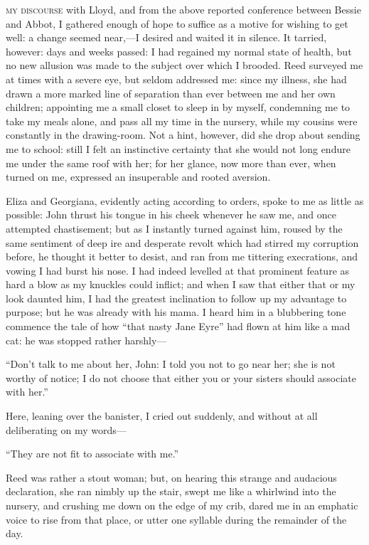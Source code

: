 
 \textsc{my discourse} with \Mr{} Lloyd, and from the above reported conference
between Bessie and Abbot, I gathered enough of hope to suffice as a
motive for wishing to get well: a change seemed near,---I desired and
waited it in silence. It tarried, however: days and weeks passed: I had
regained my normal state of health, but no new allusion was made to the
subject over which I brooded. \Mrs{} Reed surveyed me at times with a
severe eye, but seldom addressed me: since my illness, she had drawn a
more marked line of separation than ever between me and her own
children; appointing me a small closet to sleep in by myself, condemning
me to take my meals alone, and pass all my time in the nursery, while my
cousins were constantly in the drawing-room. Not a hint, however, did
she drop about sending me to school: still I felt an instinctive
certainty that she would not long endure me under the same roof with
her; for her glance, now more than ever, when turned on me, expressed an
insuperable and rooted aversion.

Eliza and Georgiana, evidently acting according to orders, spoke to me
as little as possible: John thrust his tongue in his cheek whenever he
saw me, and once attempted chastisement; but as I instantly turned
against him, roused by the same sentiment of deep ire and desperate
revolt which had stirred my corruption before, he thought it better to
desist, and ran from me tittering execrations, and vowing I had burst
his nose. I had indeed levelled at that prominent feature as hard a
blow as my knuckles could inflict; and when I saw that either that or my
look daunted him, I had the greatest inclination to follow up my
advantage to purpose; but he was already with his mama. I heard him in
a blubbering tone commence the tale of how \enquote{that nasty Jane
Eyre} had flown at him like a mad cat: he was stopped rather harshly---

\enquote{Don't talk to me about her, John: I told you not to go near
her; she is not worthy of notice; I do not choose that either you or
your sisters should associate with her.}

Here, leaning over the banister, I cried out suddenly, and without at
all deliberating on my words---

\enquote{They are not fit to associate with me.}

\Mrs{} Reed was rather a stout woman; but, on hearing this strange and
audacious declaration, she ran nimbly up the stair, swept me like a
whirlwind into the nursery, and crushing me down on the edge of my crib,
dared me in an emphatic voice to rise from that place, or utter one
syllable during the remainder of the day.

